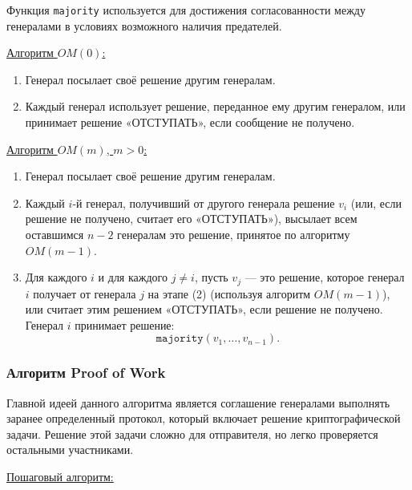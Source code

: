 Функция \texttt{majority} используется для достижения согласованности между генералами в условиях возможного наличия предателей.~\cite{vmath}

\underline{Алгоритм \(OM(0)\):}

\begin{enumerate}
    \item Генерал посылает своё решение другим генералам.
    \item Каждый генерал использует решение, переданное ему другим генералом, или принимает решение «ОТСТУПАТЬ», если сообщение не получено.
\end{enumerate}

\underline{Алгоритм \(OM(m)\), \(m > 0\):}

\begin{enumerate}
    \item Генерал посылает своё решение другим генералам.
    \item Каждый \(i\)-й генерал, получивший от другого генерала решение \(v_i\) (или, если решение не получено, считает его «ОТСТУПАТЬ»), высылает всем оставшимся \(n - 2\) генералам это решение, принятое по алгоритму \(OM(m-1)\).
    \item Для каждого \(i\) и для каждого \(j \neq i\), пусть \(v_j\) — это решение, которое генерал \(i\) получает от генерала \(j\) на этапе (2) (используя алгоритм \(OM(m-1)\)), или считает этим решением «ОТСТУПАТЬ», если решение не получено. Генерал \(i\) принимает решение:
    \[
    \texttt{majority}(v_1, \dots, v_{n-1}).
    \]
\end{enumerate}


\subsubsection{Алгоритм Proof of Work}

\hspace{1.25cm}
Главной идеей данного алгоритма является соглашение генералами выполнять заранее определенный протокол, который включает решение криптографической задачи. Решение этой задачи сложно для отправителя, но легко проверяется остальными участниками.

\underline{Пошаговый алгоритм:}


